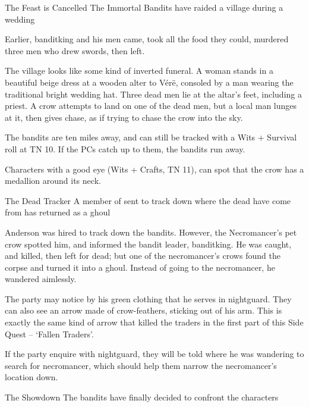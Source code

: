 \begin{multicols}{2}
{The Feast is Cancelled}%
{The Immortal Bandits have raided a village during a wedding}%

Earlier, \gls{banditking} and his men came, took all the food they could, murdered three men who drew swords, then left.

\begin{boxtext}

	The village looks like some kind of inverted funeral.
	A woman stands in a beautiful beige dress at a wooden alter to V\'{e}r\"{e}, consoled by a man wearing the traditional bright wedding hat.
	Three dead men lie at the altar's feet, including a priest.
	A crow attempts to land on one of the dead men, but a local man lunges at it, then gives chase, as if trying to chase the crow into the sky.

\end{boxtext}

The bandits are ten miles away, and can still be tracked with a Wits + Survival roll at TN 10.
If the PCs catch up to them, the bandits run away.

Characters with a good eye (Wits + Crafts, TN 11), can spot that the crow has a medallion around its neck.

{The Dead Tracker}%
{A member of  sent to track down where the dead have come from has returned as a ghoul}%

Anderson was hired to track down the bandits.
However, the Necromancer's pet crow spotted him, and informed the bandit leader, \gls{banditking}.
He was caught, and killed, then left for dead; but one of the necromancer's crows found the corpse and turned it into a ghoul.
Instead of going to the necromancer, he wandered aimlessly.

The party may notice by his green clothing that he serves in \gls{nightguard}.
They can also see an arrow made of crow-feathers, sticking out of his arm.
This is exactly the same kind of arrow that killed the traders in the first part of this Side Quest -- `Fallen Traders'.


If the party enquire with \gls{nightguard}, they will be told where he was wandering to search for \gls{necromancer}, which should help them narrow the necromancer's location down.

{The Showdown}%
{The bandits have finally decided to confront the characters}%


\end{multicols}
